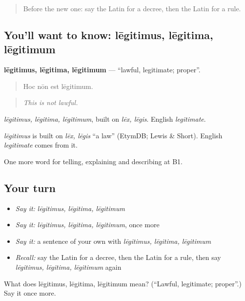 \begin{quote}
Before the new one: say the Latin for a decree, then the Latin for a rule.
\end{quote}

\subsection*{You'll want to know: lēgitimus, lēgitima, lēgitimum}
\textbf{lēgitimus, lēgitima, lēgitimum} — \textquotedblleft{}lawful, legitimate; proper\textquotedblright{}.

\begin{quote}
Hoc nōn est lēgitimum.
\end{quote}

\begin{quote}
\emph{This is not lawful.}
\end{quote}

\emph{lēgitimus, lēgitima, lēgitimum}, built on \emph{lēx, lēgis}. English \emph{legitimate}.

\begin{cousinweb}
\emph{lēgitimus} is built on \emph{lēx, lēgis} \textquotedblleft{}a law\textquotedblright{} (EtymDB; Lewis \& Short). English \emph{legitimate} comes from it.
\end{cousinweb}

\begin{grammarlens}[title={What you've built}]
One more word for telling, explaining and describing at B1.
\end{grammarlens}

\subsection*{Your turn}
\begin{itemize}
\raggedright
  \item \emph{Say it:} \emph{lēgitimus, lēgitima, lēgitimum}
  \item \emph{Say it:} \emph{lēgitimus, lēgitima, lēgitimum}, once more
  \item \emph{Say it:} a sentence of your own with \emph{lēgitimus, lēgitima, lēgitimum}
  \item \emph{Recall:} say the Latin for a decree, then the Latin for a rule, then say \emph{lēgitimus, lēgitima, lēgitimum} again
\end{itemize}

\begin{tcolorbox}[breakable,colback=teal!4,colframe=teal!35!black,title={Before you move on}]
What does lēgitimus, lēgitima, lēgitimum mean? (\textquotedblleft{}Lawful, legitimate; proper\textquotedblright{}.) Say it once more.
\end{tcolorbox}
